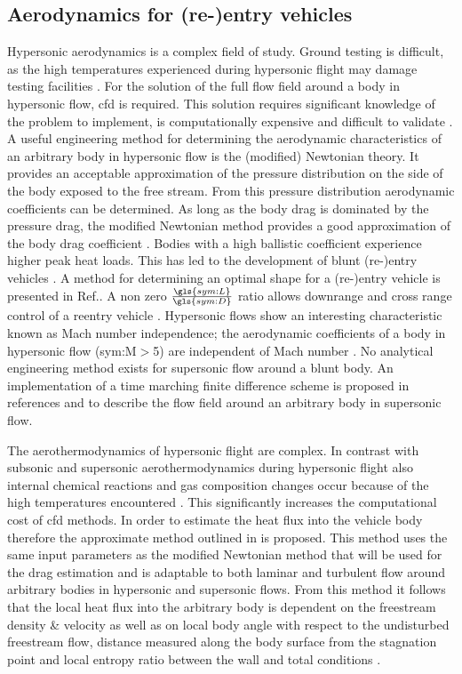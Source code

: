 \subsection{Aerodynamics for (re-)entry vehicles} \label{sec:aero}
Hypersonic aerodynamics is a complex field of study. Ground testing is difficult, as the high temperatures experienced during hypersonic flight may damage testing facilities \cite{AndersonJr.2006, Bertin1994}. For the solution of the full flow field around a body in hypersonic flow, \gls{cfd} is required. This solution requires significant knowledge of the problem to implement, is computationally expensive and difficult to validate \cite{AndersonJr.2006, Bertin1994}. A useful engineering method for determining the aerodynamic characteristics of an arbitrary body in hypersonic flow is the (modified) Newtonian theory. It provides an acceptable approximation of the pressure distribution on the side of the body exposed to the free stream. From this pressure distribution aerodynamic coefficients can be determined. As long as the body drag is dominated by the pressure drag, the modified Newtonian method provides a good approximation of the body drag coefficient \cite{AndersonJr.2006, Bertin1994, Bertin2006}. Bodies with a high ballistic coefficient experience higher peak heat loads. This has led to the development of blunt (re-)entry vehicles \cite{Bertin1994,Theisinger2009}. A method for determining an optimal shape for a (re-)entry vehicle is presented in Ref.\cite{Theisinger2009}. A non zero $\frac{\gls{sym:L}}{\gls{sym:D}}$ ratio allows downrange and cross range control of a reentry vehicle \cite{Theisinger2009}. Hypersonic flows show an interesting characteristic known as Mach number independence; the aerodynamic coefficients of a body in hypersonic flow (\gls{sym:M}$>$5) are independent of Mach number \cite{Bertin1994,AndersonJr.2007,Hollis}. No analytical engineering method exists for supersonic flow around a blunt body. An implementation of a time marching finite difference scheme is proposed in references \cite{AndersonJr.2007} and \cite{AndersonJr.2006} to describe the flow field around an arbitrary body in supersonic flow. 

The aerothermodynamics of hypersonic flight are complex. In contrast with subsonic and supersonic aerothermodynamics during hypersonic flight also internal chemical reactions and gas composition changes occur  because of the high temperatures encountered \cite{AndersonJr.2006}. This significantly increases the computational cost of \gls{cfd} methods. In order to estimate the heat flux into the vehicle body therefore the approximate method outlined in \cite{Tauber1986,AndersonJr.2006} is proposed. This method uses the same input parameters as the modified Newtonian method that will be used for the drag estimation and is adaptable to both laminar and turbulent flow around arbitrary bodies in hypersonic and supersonic flows. From this method it follows that the local heat flux into the arbitrary body is dependent on the freestream density \& velocity as well as on local body angle with respect to the undisturbed freestream flow, distance measured along the body surface from the stagnation point and local entropy ratio between the wall and total conditions \cite{Tauber1986, AndersonJr.2006}.